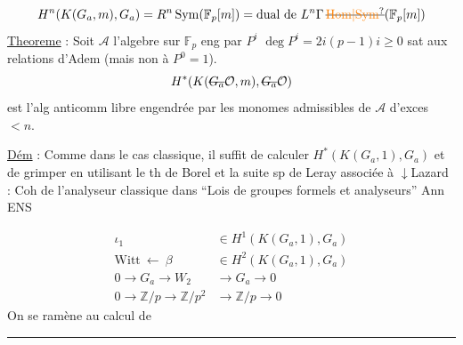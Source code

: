 \[
H^n(K(G_a,m),G_a)=R^n\operatorname{Sym}(\mathbb F_p[m])
=\text{dual de }L^n\Gamma\,\deleted{\unsure{\mathrm{Hom}|\mathrm{Sym}}}(\mathbb F_p[m])
\]
\uline{Theoreme} : Soit $\mathscr A$ l'algebre sur $\mathbb F_p$ eng par $P^i$\qquad
$\deg P^i=2i(p-1)$\qquad $i\geq0$ sat aux relations d'Adem (mais non à $P^0=1$).
\[
H^*(K(\deleted{G_a}\mathcal O,m),\deleted{G_a}\mathcal O)
\]
est l'alg anticomm libre engendrée par les monomes admissibles de $\mathscr A$ d'exces $<n$.

\uline{Dém} : Comme dans le cas classique, il suffit de calculer $H^*(K(G_a,1),G_a)$ et de grimper en utilisant le th de Borel et la suite sp de Leray associée à
$\downarrow$\quad Lazard : Coh de l'analyseur classique dans ``Lois de groupes formels et analyseurs'' Ann ENS

\[
\begin{aligned}
\iota_1&\in H^1(K(G_a,1),G_a)\\
\text{Witt}\ \longleftarrow\ \beta&\in H^2(K(G_a,1),G_a)\\
0\to G_a\to W_2&\to G_a\to0\\
0\to\mathbb Z/p\to\mathbb Z/p^2&\to\mathbb Z/p\to0
\end{aligned}
\]
On se ramène au calcul de
\noindent\rule{.8\linewidth}{.3pt}


